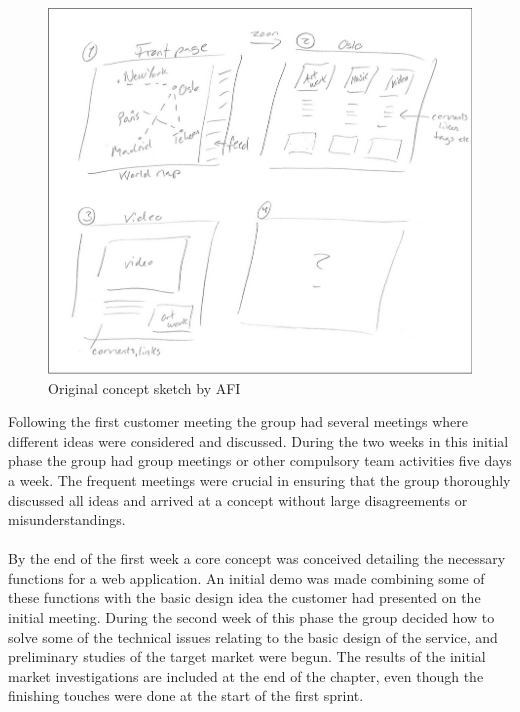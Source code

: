 \begin{figure}[ht!]
  \includegraphics[width=\linewidth]{./PreliminaryStudies/img/conceptSketch}
  \caption{Original concept sketch by AFI}
  \label{fig:PrelimWorkSketch}
\end{figure}

Following the first customer meeting the group had several meetings where different ideas were considered and discussed. During the two weeks in this initial phase the group had group meetings or other compulsory team activities five days a week. The frequent meetings were crucial in ensuring that the group thoroughly discussed all ideas and arrived at a concept without large disagreements or misunderstandings.
\paragraph{} By the end of the first week a core concept was conceived detailing the necessary functions for a web application. An initial demo was made combining some of these functions with the basic design idea the customer had presented on the initial meeting. During the second week of this phase the group decided how to solve some of the technical issues relating to the basic design of the service, and preliminary studies of the target market were begun. The results of the initial market investigations are included at the end of the chapter, even though the finishing touches were done at the start of the first sprint.

